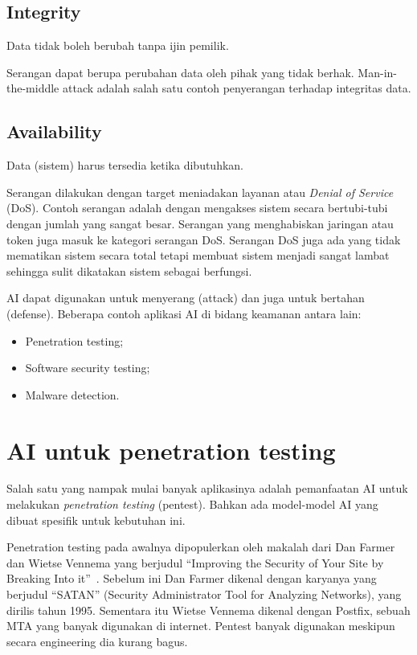 \subsection{Integrity}
Data tidak boleh berubah tanpa ijin pemilik.

Serangan dapat berupa perubahan data oleh pihak yang tidak berhak.
Man-in-the-middle attack adalah salah satu contoh penyerangan
terhadap integritas data.

\subsection{Availability}
Data (sistem) harus tersedia ketika dibutuhkan.

Serangan dilakukan dengan target meniadakan layanan
atau \emph{Denial of Service} (DoS).
Contoh serangan adalah dengan mengakses sistem secara bertubi-tubi
dengan jumlah yang sangat besar.
Serangan yang menghabiskan jaringan atau token juga masuk ke kategori
serangan DoS.
Serangan DoS juga ada yang tidak mematikan sistem secara total
tetapi membuat sistem menjadi sangat lambat sehingga sulit dikatakan
sistem sebagai berfungsi.


AI dapat digunakan untuk menyerang (attack)
dan juga untuk bertahan (defense).
Beberapa contoh aplikasi AI di bidang keamanan antara lain:
\begin{itemize}
\item Penetration testing;
\item Software security testing;
\item Malware detection.
\end{itemize}


\section{AI untuk penetration testing}
Salah satu yang nampak mulai banyak aplikasinya adalah pemanfaatan AI
untuk melakukan \emph{penetration testing} (pentest).
Bahkan ada model-model AI yang dibuat spesifik untuk kebutuhan ini.

Penetration testing pada awalnya dipopulerkan oleh makalah dari
Dan Farmer dan Wietse Vennema yang berjudul
``Improving the Security of Your Site by Breaking Into it''~\cite{farmer1993improving}.
Sebelum ini Dan Farmer dikenal dengan karyanya yang berjudul ``SATAN''
(Security Administrator Tool for Analyzing Networks), yang dirilis
tahun 1995.
Sementara itu Wietse Vennema dikenal dengan Postfix, sebuah MTA
yang banyak digunakan di internet.
Pentest banyak digunakan meskipun secara engineering dia kurang bagus.

